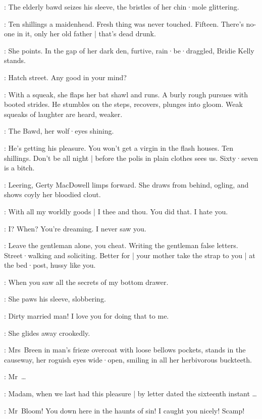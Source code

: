 :
The elderly bawd seizes his sleeve,
the bristles of her chin·mole glittering.

\Bawd:
Ten shillings a maidenhead.
Fresh thing was never touched.
Fifteen.
There's no-one in it,
only her old father |
that's dead drunk.

:
She points.
In the gap of her dark den,
furtive,
rain·be·draggled,
Bridie Kelly stands.

\Bridie:
Hatch street.
Any good in your mind?

:
With a squeak,
she flaps her bat shawl and runs.
A burly rough pursues with booted strides.
He stumbles on the steps,
recovers,
plunges into gloom.
Weak squeaks of laughter are heard,
weaker.

:
The Bawd,
her wolf·eyes shining.

\Bawd:
He's getting his pleasure.
You won't get a virgin in the flash houses.
Ten shillings.
Don't be all night |
before the polis in plain clothes sees us.
Sixty·seven is a bitch.

:
Leering,
Gerty MacDowell limps forward.
She draws from behind,
ogling,
and shows coyly her bloodied clout.

\Gerty:
With all my worldly goods |
I thee and thou.
You did that.
I hate you.

\Bloom:
I?
When?
You're dreaming.
I never saw you.

\Bawd:
Leave the gentleman alone,
you cheat.
Writing the gentleman false letters.
Street·walking and soliciting.
Better for |
your mother take the strap to you |
at the bed·post,
hussy like you.

\Gerty:
\sout{}
When you saw all the secrets of my bottom drawer.

:
She paws his sleeve,
slobbering.

\Gerty:
Dirty married man!
I love you for doing that to me.

:
She glides away crookedly.

:
Mrs~Breen in man's frieze overcoat with loose bellows pockets,
stands in the causeway,
her roguish eyes wide·open,
smiling in all her herbivorous buckteeth.

\MrsBreen:
Mr~\ldots
{}

\Bloom:
Madam,
when we last had this pleasure |
by letter dated the sixteenth instant \ldots

\MrsBreen:
Mr~Bloom!
You down here in the haunts of sin!
I caught you nicely!
Scamp!

